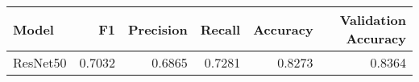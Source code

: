 \begin{tabular}{lrrrrr}
\toprule
Model & F1 & Precision & Recall & Accuracy & Validation Accuracy \\
\midrule
ResNet50 & 0.7032 & 0.6865 & 0.7281 & 0.8273 & 0.8364 \\
\bottomrule
\end{tabular}
